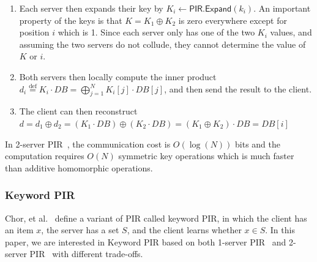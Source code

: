 \documentclass[11pt]{article} %
\newcommand{\pirexpand}{\textsf{PIR.Expand}}
\newcommand{\remove}[1]{}
\begin{document}
{\begin{enumerate}
		\item Each server then expands their key by $K_i \gets \pirexpand(k_i)$. An important property of the keys is that $K = K_1 \oplus K_2$ is zero everywhere except for position $i$ which is 1. Since each server only has one of the two $K_i$ values, and assuming the two servers do not collude, they cannot determine the value of $K$ or $i$.
		
		\item Both servers then locally compute the inner product $d_i \overset{\textrm{def}}= K_i \cdot DB = \textstyle\bigoplus_{j=1}^N K_i[j] \cdot DB[j]$, and then send the result to the client.
		
		\item The client can then reconstruct $d = d_1 \oplus d_2 = (K_1 \cdot DB) \oplus (K_2 \cdot DB) = (K_1 \oplus K_2) \cdot DB = DB[i]$
		
	\end{enumerate}
	
	In 2-server PIR~\cite{EC:BoyGilIsh15,CCS:BoyGilIsh16}, the communication cost is $O(\log(N))$ bits and the computation requires $O(N)$ symmetric key operations which is much faster than additive homomorphic operations.
	
	\subsubsection{Keyword PIR}
	}
	Chor, et al.~\cite{EPRINT:ChoGilNao98} define a variant of PIR called keyword PIR, in which the client has an item $x$, the server has a set $S$, and the client learns whether $x \in S$.  \remove{This variant of PIR has been used for the password checkup problem~\cite{EPRINT:ALPRSSY19}, where a client aims to check whether their password is contained in breached data, without revealing the password itself.One implementation of keyword PIR is based on PIR with Cuckoo hashing~\cite{10.1007}, which requires approximately three times the costs of regular PIR. Another solution~\cite{EPRINT:ALPRSSY19} relies on bucketing which we describe more detail in Section \ref{subs:impl_optz}.} In this paper, we are interested in Keyword PIR based on both 1-server PIR~\cite{SP:ACLS18,  EPRINT:ALPRSSY19} and 2-server PIR~\cite{EC:BoyGilIsh15,CCS:BoyGilIsh16} with different trade-offs.
	
\end{document}
